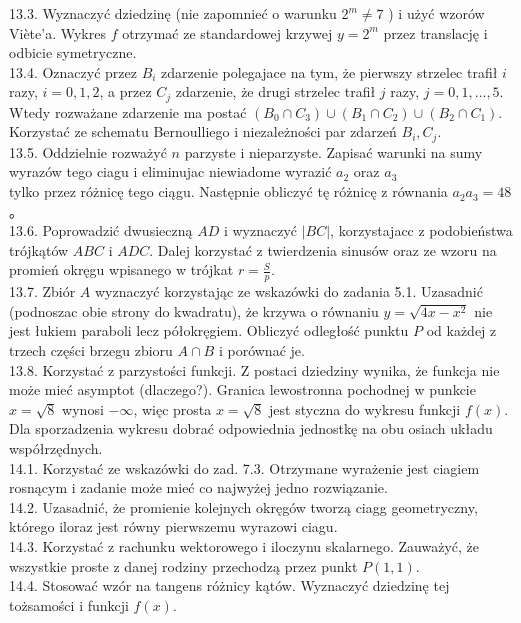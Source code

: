 \documentclass[10pt]{article}
\begin{document}
13.3. Wyznaczyć dziedzinę (nie zapomnieć o warunku $2^{m} \neq 7$ ) i użyć wzorów Viète'a. Wykres $f$ otrzymać ze standardowej krzywej $y=2^{m}$ przez translację i odbicie symetryczne.\\
13.4. Oznaczyć przez $B_{i}$ zdarzenie polegajace na tym, że pierwszy strzelec trafił $i$ razy, $i=0,1,2$, a przez $C_{j}$ zdarzenie, że drugi strzelec trafił $j$ razy, $j=0,1, \ldots, 5$. Wtedy rozważane zdarzenie ma postać $\left(B_{0} \cap C_{3}\right) \cup\left(B_{1} \cap C_{2}\right) \cup\left(B_{2} \cap C_{1}\right)$. Korzystać ze schematu Bernoulliego i niezależności par zdarzeń $B_{i}, C_{j}$.\\
13.5. Oddzielnie rozważyć $n$ parzyste i nieparzyste. Zapisać warunki na sumy wyrazów tego ciagu i eliminujac niewiadome wyrazić $a_{2}$ oraz $a_{3}$\\
tylko przez różnicę tego ciągu. Następnie obliczyć tę różnicę z równania $a_{2} a_{3}=48$ 。\\
13.6. Poprowadzić dwusieczną $A D$ i wyznaczyć $|B C|$, korzystajacc z podobieństwa trójkątów $A B C$ i $A D C$. Dalej korzystać z twierdzenia sinusów oraz ze wzoru na promień okręgu wpisanego w trójkat $r=\frac{S}{p}$.\\
13.7. Zbiór $A$ wyznaczyć korzystając ze wskazówki do zadania 5.1. Uzasadnić (podnoszac obie strony do kwadratu), że krzywa o równaniu $y=\sqrt{4 x-x^{2}}$ nie jest łukiem paraboli lecz półokręgiem. Obliczyć odległość punktu $P$ od każdej z trzech części brzegu zbioru $A \cap B$ i porównać je.\\
13.8. Korzystać z parzystości funkcji. Z postaci dziedziny wynika, że funkcja nie może mieć asymptot (dlaczego?). Granica lewostronna pochodnej w punkcie $x=\sqrt{8}$ wynosi $-\infty$, więc prosta $x=\sqrt{8}$ jest styczna do wykresu funkcji $f(x)$. Dla sporzadzenia wykresu dobrać odpowiednia jednostkę na obu osiach układu współrzędnych.\\
14.1. Korzystać ze wskazówki do zad. 7.3. Otrzymane wyrażenie jest ciagiem rosnącym i zadanie może mieć co najwyżej jedno rozwiązanie.\\
14.2. Uzasadnić, że promienie kolejnych okręgów tworzą ciagg geometryczny, którego iloraz jest równy pierwszemu wyrazowi ciagu.\\
14.3. Korzystać z rachunku wektorowego i iloczynu skalarnego. Zauważyć, że wszystkie proste z danej rodziny przechodzą przez punkt $P(1,1)$.\\
14.4. Stosować wzór na tangens różnicy kątów. Wyznaczyć dziedzinę tej tożsamości i funkcji $f(x)$.\\
\end{document}
